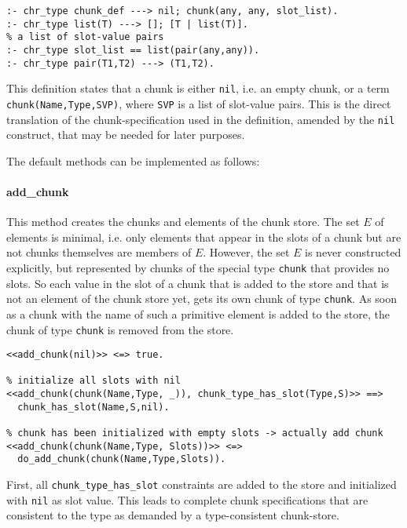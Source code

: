 \begin{lstlisting}
:- chr_type chunk_def ---> nil; chunk(any, any, slot_list).
:- chr_type list(T) ---> []; [T | list(T)].
% a list of slot-value pairs
:- chr_type slot_list == list(pair(any,any)).
:- chr_type pair(T1,T2) ---> (T1,T2).
\end{lstlisting}

This definition states that a chunk is either \lstinline|nil|, i.e. an empty chunk, or a term \lstinline|chunk(Name,Type,SVP)|, where \lstinline|SVP| is a list of slot-value pairs. This is the direct translation of the chunk-specification used in the definition, amended by the \lstinline|nil| construct, that may be needed for later purposes.

The default methods can be implemented as follows:

\paragraph{add\_chunk}

This method creates the chunks and elements of the chunk store. The set $E$ of elements is minimal, i.e. only elements that appear in the slots of a chunk but are not chunks themselves are members of $E$. However, the set $E$ is never constructed explicitly, but represented by chunks of the special type \lstinline|chunk| that provides no slots. So each value in the slot of a chunk that is added to the store and that is not an element of the chunk store yet, gets its own chunk of type \lstinline|chunk|. As soon as a chunk with the name of such a primitive element is added to the store, the chunk of type \lstinline|chunk| is removed from the store.

\begin{lstlisting}[caption={Rules for \texttt{add\_chunk}}, label=lst:add_chunk_rules]
% empty chunk will not be added
<<add_chunk(nil)>> <=> true.
  
% initialize all slots with nil
<<add_chunk(chunk(Name,Type, _)), chunk_type_has_slot(Type,S)>> ==> 
  chunk_has_slot(Name,S,nil).

% chunk has been initialized with empty slots -> actually add chunk
<<add_chunk(chunk(Name,Type, Slots))>> <=>
  do_add_chunk(chunk(Name,Type,Slots)).
\end{lstlisting}

First, all \lstinline|chunk_type_has_slot| constraints are added to the store and initialized with \lstinline|nil| as slot value. This leads to complete chunk specifications that are consistent to the type as demanded by a type-consistent chunk-store.

